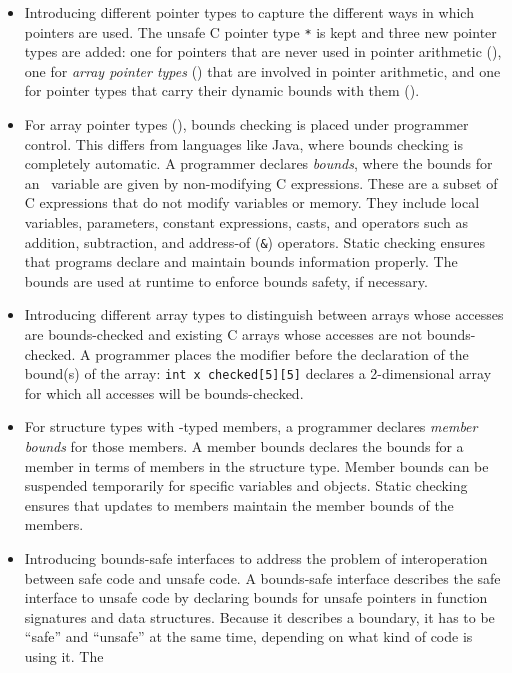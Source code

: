 \begin{itemize}
\item
  Introducing different pointer types to capture the different ways in
  which pointers are used. The unsafe C pointer type \texttt{*} is kept
  and three new pointer types are added: one for pointers that are never
  used in pointer arithmetic (\ptr), one for \emph{array pointer
  types} (\arrayptr) that are involved in pointer arithmetic,
  and one for pointer types that carry their dynamic bounds with them
  (\arrayview ).
\item
  For array pointer types (\arrayptr), bounds checking is
  placed under programmer control. This differs from languages like
  Java, where bounds checking is completely automatic. A programmer
  declares \emph{bounds}, where the bounds for an \arrayptr\
  variable are given by non-modifying C expressions. These are a subset
  of C expressions that do not modify variables or memory. They include
  local variables, parameters, constant expressions, casts, and
  operators such as addition, subtraction, and address-of (\texttt{\&})
  operators. Static checking ensures that programs declare and maintain
  bounds information properly. The bounds are used at runtime to enforce
  bounds safety, if necessary.
\item
  Introducing different array types to distinguish between arrays whose
  accesses are bounds-checked and existing C arrays whose accesses are
  not bounds-checked. A programmer places the modifier 
  before the declaration of the bound(s) of the array: \texttt{int x
  checked[5][5]} declares a 2-dimensional array for which all
  accesses will be bounds-checked.
\item
  For structure types with \arrayptr -typed members, a
  programmer declares \emph{member bounds} for those members. A member
  bounds declares the bounds for a member in terms of members in the
  structure type. Member bounds can be suspended temporarily for
  specific variables and objects. Static checking ensures that updates
  to members maintain the member bounds of the members.
\item
  Introducing bounds-safe interfaces to address the problem of
  interoperation between safe code and unsafe code. A bounds-safe
  interface describes the safe interface to unsafe code by declaring
  bounds for unsafe pointers in function signatures and data structures.
  Because it describes a boundary, it has to be ``safe'' and ``unsafe''
  at the same time, depending on what kind of code is using it. The

\end{itemize}

